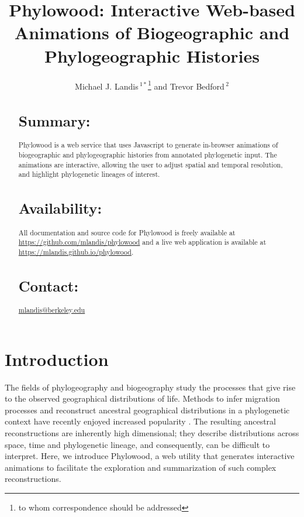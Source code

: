 \documentclass{bioinfo}
\begin{document}

\title[Phylowood: biogeographic animations]{Phylowood: Interactive Web-based Animations of Biogeographic and Phylogeographic Histories}
\author[Landis and Bedford]{Michael J. Landis\,$^{1*}$\footnote{to whom correspondence should be addressed}  and Trevor Bedford\,$^2$}
\address{$^{1}$Department of Integrative Biology, UC Berkeley, Berkeley, California, USA\\
$^{2}$Institute of Evolution, University of Edinburgh, Edinburgh, UK}



\maketitle

\begin{abstract}
\section{Summary:} Phylowood is a web service that uses Javascript to generate in-browser animations of biogeographic and phylogeographic histories from annotated phylogenetic input. The animations are interactive, allowing the user to adjust spatial and temporal resolution, and highlight phylogenetic lineages of interest.
\section{Availability:} All documentation and source code for Phylowood is freely available at \href{https://github.com/mlandis/phylowood}{https://github.com/mlandis/phylowood} and a live web application is available at \href{https://mlandis.github.io/phylowood}{https://mlandis.github.io/phylowood}.
\section{Contact:} \href{mlandis@berkeley.edu}{mlandis@berkeley.edu}
\end{abstract}

\section{Introduction}
The fields of phylogeography and biogeography study the processes that give rise to the observed geographical distributions of life. Methods to infer migration processes and reconstruct ancestral geographical distributions in a phylogenetic context have recently enjoyed increased popularity \citep{ree08, lemey09, landis13}. The resulting ancestral reconstructions are inherently high dimensional; they describe distributions across space, time and phylogenetic lineage, and consequently, can be difficult to interpret. Here, we introduce Phylowood, a web utility that generates interactive animations to facilitate the exploration and summarization of such complex reconstructions.
\end{document}
